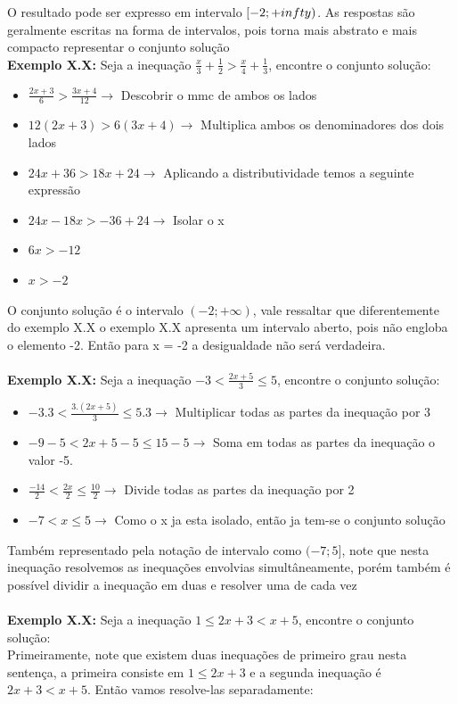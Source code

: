 \documentclass[a4paper,12pt,twoside,BCOR=10mm]{scrbook}
\begin{document}
\begin{titlepage}
\begin{itemize}
\end{itemize}
O resultado pode ser expresso em intervalo $[-2 ; +\\infty)$. As respostas são geralmente escritas na forma de intervalos, pois torna mais abstrato e mais compacto representar o conjunto solução
\\
\textbf{Exemplo X.X:} Seja a inequação $\frac{x}{3} + \frac{1}{2} > \frac{x}{4} + \frac{1}{3}$, encontre o conjunto solução: 
\\
\begin{itemize}
	\item $\frac{2x + 3}{6} > \frac{3x + 4}{12} \rightarrow$ Descobrir o mmc de ambos os lados
	\item $12(2x + 3) > 6(3x + 4) \rightarrow$ Multiplica ambos os denominadores dos dois lados
	\item $24x + 36 > 18x + 24 \rightarrow$ Aplicando a distributividade temos a seguinte expressão
	\item $24x - 18x > -36 + 24 \rightarrow$ Isolar o x
	\item $6x > -12$
	\item $x > -2$	
\end{itemize}
O conjunto solução é o intervalo $(-2 ; +\infty)$, vale ressaltar que diferentemente do exemplo X.X o exemplo X.X apresenta um intervalo aberto, pois não engloba o elemento -2. Então para x = -2 a desigualdade não será verdadeira.
\\
\\
\textbf{Exemplo X.X:} Seja a inequação $ -3 < \frac{2x + 5}{3} \leq 5 $, encontre o conjunto solução: 
\\
\begin{itemize}
	\item $ -3.3 < \frac{3.(2x + 5)}{3} \leq 5.3  \rightarrow$ Multiplicar todas as partes da inequação por 3
	\item $ -9 -5 < 2x + 5 -5 \leq 15 -5 \rightarrow$ Soma em todas as partes da inequação o valor -5.
	\item $ \frac{-14}{2} < \frac{2x}{2} \leq \frac{10}{2} \rightarrow$ Divide todas as partes da inequação por 2
	\item $ -7 < x \leq 5 \rightarrow$ Como o x ja esta isolado, então ja tem-se o conjunto solução
\end{itemize}
Também representado pela notação de intervalo como $(-7;5]$, note que nesta inequação resolvemos as inequações envolvias simultâneamente, porém também é possível dividir a inequação em duas e resolver uma de cada vez
\\
\\
\textbf{Exemplo X.X:} Seja a inequação $ 1 \leq 2x + 3 < x + 5 $, encontre o conjunto solução: 
\\
Primeiramente, note que existem duas inequações de primeiro grau nesta sentença, a primeira consiste em $1 \leq 2x + 3$ e a segunda inequação é $2x + 3 < x + 5$. Então vamos resolve-las separadamente:

\end{titlepage}
\end{document}
